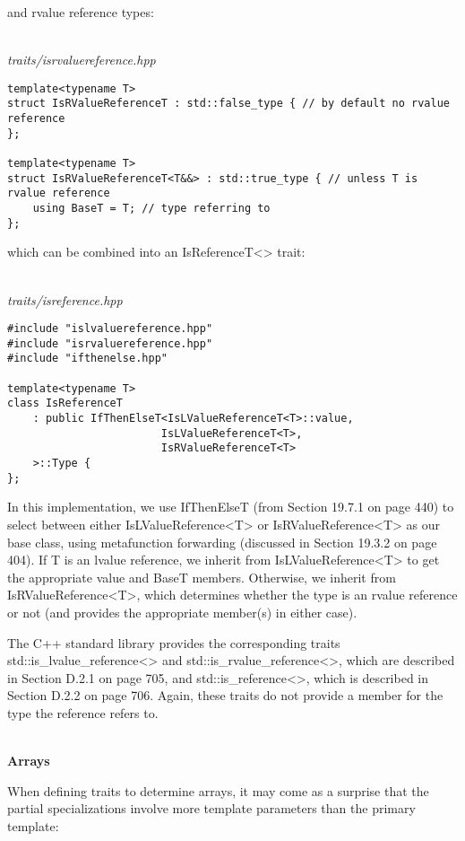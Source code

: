 and rvalue reference types:

\hspace*{\fill} \\ %
\noindent
\textit{traits/isrvaluereference.hpp}
\begin{lstlisting}[style=styleCXX]
template<typename T>
struct IsRValueReferenceT : std::false_type { // by default no rvalue reference
};

template<typename T>
struct IsRValueReferenceT<T&&> : std::true_type { // unless T is rvalue reference
	using BaseT = T; // type referring to
};
\end{lstlisting}

which can be combined into an IsReferenceT<> trait:

\hspace*{\fill} \\ %
\noindent
\textit{traits/isreference.hpp}
\begin{lstlisting}[style=styleCXX]
#include "islvaluereference.hpp"
#include "isrvaluereference.hpp"
#include "ifthenelse.hpp"

template<typename T>
class IsReferenceT
	: public IfThenElseT<IsLValueReferenceT<T>::value,
						IsLValueReferenceT<T>,
						IsRValueReferenceT<T>
	>::Type {
};
\end{lstlisting}

In this implementation, we use IfThenElseT (from Section 19.7.1 on page 440) to select between either IsLValueReference<T> or IsRValueReference<T> as our base class, using metafunction forwarding (discussed in Section 19.3.2 on page 404). If T is an lvalue reference, we inherit from IsLValueReference<T> to get the appropriate value and BaseT members. Otherwise, we inherit from IsRValueReference<T>, which determines whether the type is an rvalue reference or not (and provides the appropriate member(s) in either case).

The C++ standard library provides the corresponding traits std::is\_lvalue\_reference<> and std::is\_rvalue\_reference<>, which are described in Section D.2.1 on page 705, and std::is\_reference<>, which is described in Section D.2.2 on page 706. Again, these traits do not provide a member for the type the reference refers to.

\hspace*{\fill} \\ %
\noindent
\textbf{Arrays}

When defining traits to determine arrays, it may come as a surprise that the partial specializations involve more template parameters than the primary template:

